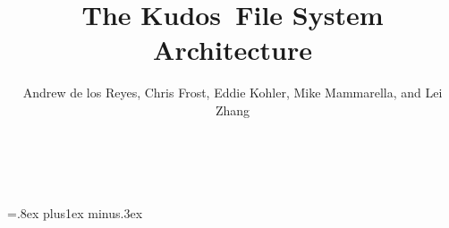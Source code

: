 \documentclass[10pt,twocolumn,letterpaper]{article}
\newcommand{\Kudos}{Kudos}
\begin{document}
\normalsize

\title{\sffamily\textbf{The \Kudos\ File System Architecture}}


\author{\sffamily Andrew de los Reyes, Chris Frost, Eddie Kohler, Mike
Mammarella, and Lei Zhang \\
\noalign{\vskip2pt}
 \\
\noalign{\vskip2pt}
 \\
\noalign{\vskip-.25in}
\null}
\date{}
\maketitle

\def\assast{\raise.2ex\hbox{$^\ast$}}























\begin{footnotesize}
\bibsep=.8ex plus1ex minus.3ex


\end{footnotesize}
\end{document}
